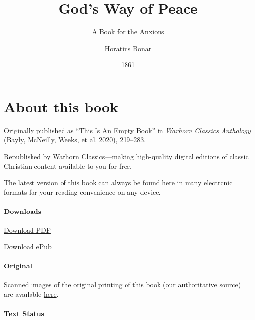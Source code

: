 \documentclass[
]{book}
\title{God's Way of Peace}
\subtitle{A Book for the Anxious}
\author{Horatius Bonar}
\date{1861}
\begin{document}
\maketitle

\mainmatter
{}

{
\setcounter{tocdepth}{1}
\tableofcontents
}
\hypertarget{about-this-book}{%
\chapter*{About this book}\label{about-this-book}}

Originally published as ``This Is An Empty Book'' in \emph{Warhorn Classics Anthology} (Bayly, McNeilly, Weeks, et al, 2020), 219--283.

Republished by \href{https://classics.warhornmedia.com/}{Warhorn Classics}---making high-quality digital editions of classic Christian content available to you for free.

The latest version of this book can always be found \href{https://warhornmedia.github.io/bonar-peace/}{here} in many electronic formats for your reading convenience on any device.

\hypertarget{downloads}{%
\subsubsection*{Downloads}\label{downloads}}

\href{https://warhornmedia.github.io/bonar-peace//Bonar-Peace.pdf}{Download PDF}

\href{https://warhornmedia.github.io/bonar-peace//Bonar-Peace.epub}{Download ePub}

\hypertarget{original}{%
\subsubsection*{Original}\label{original}}

Scanned images of the original printing of this book (our authoritative source) are available \href{https://archive.org/details/godswayofpeacebo00bona/page/n5/mode/2up}{here}.

\hypertarget{text-status}{%
\subsubsection*{Text Status}\label{text-status}}
\end{document}
